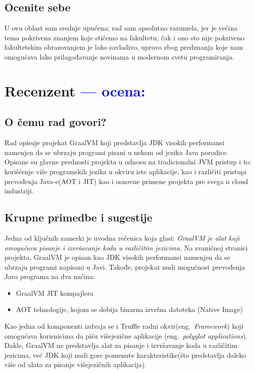 \documentclass[a4paper]{report}
\newcommand{\odgovor}[1]{\textcolor{blue}{#1}}
\begin{document}
	\section{Ocenite sebe}
	U ovu oblast sam srednje upućena; rad sam apsolutno razumela, jer je većina tema pokrivena znanjem koje stičemo na fakultetu, čak i ono sto nije pokriveno fakultetskim obrazovanjem je lako savladivo, upravo zbog predznanja koje nam omogućava lako prilagođavanje novinama u modernom svetu programiranja.
	
	
\chapter{Recenzent \odgovor{--- ocena:} }


\section{O čemu rad govori?}
Rad opisuje projekat GraalVM koji predstavlja JDK visokih performansi namenjen da se ubrzaju programi pisani u nekom od jezika Java porodice.
Opisane su glavne prednosti projekta u odnosu na tradicionalni JVM pristup i to: korišćenje više programskih jezika u okviru iste aplikacije,
kao i različiti pristupi prevođenja Java-e(AOT i JIT) kao i osnovne primene projekta pre svega u cloud industriji.

\section{Krupne primedbe i sugestije}
Jedna od ključnih zamerki je uvodna rečenica koja glasi: \textit{GraalVM je alat koji omogućava pisanje i izvršavanje koda u različitim
jezicima}. Na zvaničnoj stranici projekta, GraalVM je opisan kao JDK visokih performansi namenjen da se ubrzaju programi napisani u Javi.
Takođe, projekat nudi mogućnost prevođenja Java programa na dva načina:
\begin{itemize}
    \item GraalVM JIT kompajlera
    \item AOT tehnologije, kojom se dobija binarna izvršna datoteka (Native Image)
\end{itemize}
Kao jedna od komponenti izdvaja se i Truffle radni okvir(eng.~{\em Framework}) koji omogućava korisnicima da pišu višejezične aplikacije 
(eng.~{\em polyglot applications}). 
Dakle, GraalVM ne predstavlja alat za pisanje i izvršavanje koda u različitim jezicima, već JDK koji nudi gore pomenute karakteristike(što 
predstavlja daleko više od alata za pisanje višejezičnih aplikacija).
\end{document}
